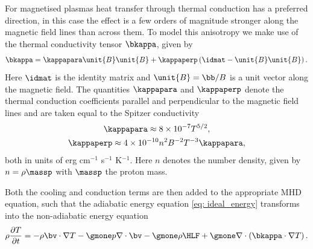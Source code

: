 For magnetised plasmas heat transfer through thermal conduction has a preferred direction, in this case the effect is a few orders of magnitude stronger along the magnetic field lines than across them. To model this anisotropy we make use of the thermal conductivity tensor $\bkappa$, given by
\begin{equation} \label{eq: conduction}
  \bkappa = \kappapara\unit{B}\unit{B} + \kappaperp\left(\idmat - \unit{B}\unit{B}\right).
\end{equation}
Here $\idmat$ is the identity matrix and $\unit{B} = \bb/B$ is a unit vector along the magnetic field. The quantities $\kappapara$ and $\kappaperp$ denote the thermal conduction coefficients parallel and perpendicular to the magnetic field lines and are taken equal to the Spitzer conductivity \citep{book_priest}
\begin{equation} \label{eq: thermal_coeffs}
  \begin{gathered}
    \kappapara \approx 8 \times 10^{-7} T^{5/2}, \\
    \kappaperp \approx 4 \times 10^{-10} n^2 B^{-2} T^{-3} \kappapara,
  \end{gathered}
\end{equation}
both in units of erg cm$^{-1}$ s$^{-1}$ K$^{-1}$. Here $n$ denotes the number density, given by $n = \rho \massp$ with $\massp$ the proton mass.

Both the cooling and conduction terms are then added to the appropriate \gls{MHD} equation, such that the adiabatic energy equation \eqref{eq: ideal_energy} transforms into the non-adiabatic energy equation
\begin{equation} \label{eq: nonad_energy}
  \rho \frac{\partial T}{\partial t} =
    -\rho \bv \cdot \nabla T
    -\gmone p \nabla \cdot \bv
    -\gmone \rho \HLF
    +\gmone \nabla \cdot \left(\bkappa \cdot \nabla T\right).
\end{equation}


